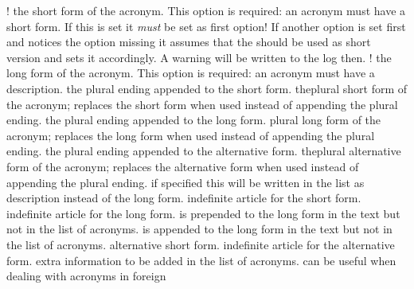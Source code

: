 \documentclass[load-preamble+]{cnltx-doc}
\begin{document}
\begin{options}
  \Default!
    the short form of the acronym.  This option is required: an acronym must
    have a short form.  If this is set it \emph{must} be set as first option!
    If another option is set first and notices the  option
    missing it assumes that the  should be used as short version and
    sets it accordingly.  A warning will be written to the log then.
  \Default!
    the long form of the acronym.  This option is required: an acronym must
    have a description.
    the plural ending appended to the short form.
    theplural short form of the acronym; replaces the short
    form when used instead of appending the plural ending.
    the plural ending appended to the long form.
    plural long form of the acronym; replaces the long form when used
    instead of appending the plural ending.
    the plural ending appended to the alternative form.
    theplural alternative form of the acronym; replaces the
    alternative form when used instead of appending the plural ending.
    if specified this will be written in the list as
    description instead of the long form.
    indefinite article for the short form.
    indefinite article for the long form.
     is prepended to the long form in the text
    but not in the list of acronyms.
     is appended to the long form in the text but
    not in the list of acronyms.
    alternative short form.
    indefinite article for the alternative form.
    extra information to be added in the list of acronyms.
    can be useful when dealing with acronyms in foreign

\end{options}
\end{document}
